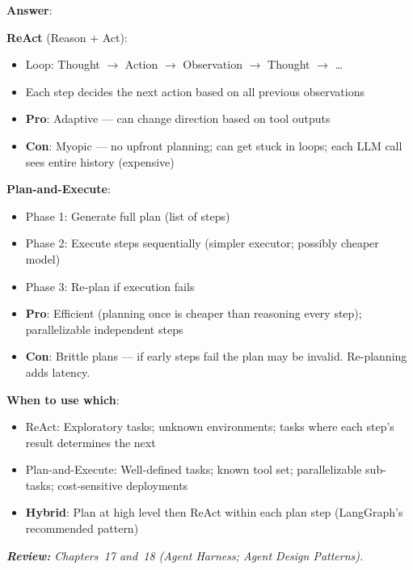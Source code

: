 \begin{questionbox}
\textbf{Answer}:

\textbf{ReAct} (Reason + Act):

\begin{itemize}
  \item Loop: Thought $\to$ Action $\to$ Observation $\to$ Thought $\to$ \ldots{}
  \item Each step decides the next action based on all previous observations
  \item \textbf{Pro}: Adaptive --- can change direction based on tool outputs
  \item \textbf{Con}: Myopic --- no upfront planning; can get stuck in loops; each LLM call sees entire history (expensive)
\end{itemize}

\textbf{Plan-and-Execute}:

\begin{itemize}
  \item Phase 1: Generate full plan (list of steps)
  \item Phase 2: Execute steps sequentially (simpler executor; possibly cheaper model)
  \item Phase 3: Re-plan if execution fails
  \item \textbf{Pro}: Efficient (planning once is cheaper than reasoning every step); parallelizable independent steps
  \item \textbf{Con}: Brittle plans --- if early steps fail the plan may be invalid. Re-planning adds latency.
\end{itemize}

\textbf{When to use which}:

\begin{itemize}
  \item ReAct: Exploratory tasks; unknown environments; tasks where each step’s result determines the next
  \item Plan-and-Execute: Well-defined tasks; known tool set; parallelizable sub-tasks; cost-sensitive deployments
  \item \textbf{Hybrid}: Plan at high level then ReAct within each plan step (LangGraph’s recommended pattern)
\end{itemize}

\emph{\textbf{Review:} Chapters~17 and~18 (Agent Harness; Agent Design Patterns).}
\end{questionbox}

